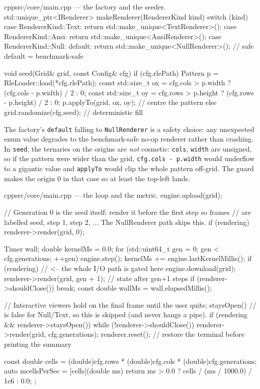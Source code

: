 \documentclass[
	english,
	letterpaper, oneside
]{article}
\begin{document}
\begin{sourcecode}{cpp}{src/core/main.cpp --- the factory and the seeder.}
std::unique_ptr<IRenderer> makeRenderer(RendererKind kind) {
  switch (kind) {
    case RendererKind::Text: return std::make_unique<TextRenderer>();
    case RendererKind::Ansi: return std::make_unique<AnsiRenderer>();
    case RendererKind::Null:
    default: return std::make_unique<NullRenderer>();   // safe default = benchmark-safe
  }
}

void seed(Grid& grid, const Config& cfg) {
  if (cfg.rlePath) {
    Pattern p = RleLoader::load(*cfg.rlePath);
    const std::size_t ox = cfg.cols > p.width  ? (cfg.cols - p.width)  / 2 : 0;
    const std::size_t oy = cfg.rows > p.height ? (cfg.rows - p.height) / 2 : 0;
    p.applyTo(grid, ox, oy);                              // centre the pattern
  } else {
    grid.randomize(cfg.seed);                             // deterministic fill
  }
}
\end{sourcecode}

The factory's \texttt{default} falling to \texttt{NullRenderer} is a safety
choice: any unexpected enum value degrades to the benchmark-safe no-op renderer
rather than crashing. In \texttt{seed}, the ternaries on the origins are
\emph{not} cosmetic: \texttt{cols}, \texttt{width} are unsigned, so if the
pattern were wider than the grid, \texttt{cfg.cols - p.width} would underflow to
a gigantic value and \texttt{applyTo} would clip the whole pattern off-grid. The
guard makes the origin $0$ in that case so at least the top-left lands.

\begin{sourcecode}{cpp}{src/core/main.cpp --- the loop and the metric.}
engine.upload(grid);

// Generation 0 is the seed itself: render it before the first step so frames
// are labelled seed, step 1, step 2, ... The NullRenderer path skips this.
if (rendering) renderer->render(grid, 0);

Timer wall;
double kernelMs = 0.0;
for (std::uint64_t gen = 0; gen < cfg.generations; ++gen) {
  engine.step();
  kernelMs += engine.lastKernelMillis();
  if (rendering) {                       // <-- the whole I/O path is gated here
    engine.download(grid);
    renderer->render(grid, gen + 1);     // state after gen+1 steps
    if (renderer->shouldClose()) break;
  }
}
const double wallMs = wall.elapsedMillis();

// Interactive viewers hold on the final frame until the user quits; staysOpen()
// is false for Null/Text, so this is skipped (and never hangs a pipe).
if (rendering && renderer->staysOpen())
  while (!renderer->shouldClose()) renderer->render(grid, cfg.generations);
renderer.reset(); // restore the terminal before printing the summary

const double cells = (double)cfg.rows * (double)cfg.cols * (double)cfg.generations;
auto mcellsPerSec = [cells](double ms) {
  return ms > 0.0 ? cells / (ms / 1000.0) / 1e6 : 0.0;
};
\end{sourcecode}
\end{document}

